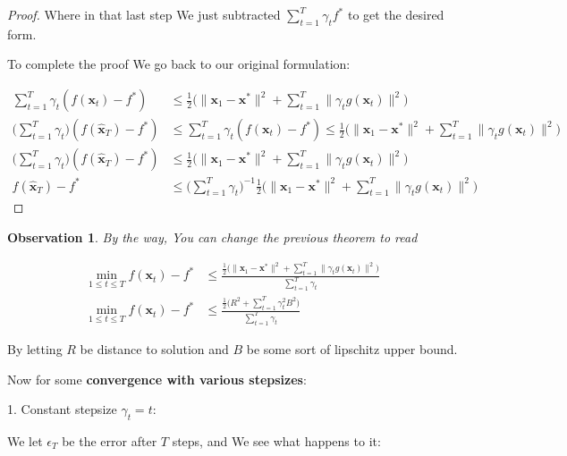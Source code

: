 \documentclass{article}
\newtheorem{observation}[theorem]{Observation}
\begin{document}
\begin{proof}
			Where in that last step We just subtracted $\sum^T_{t=1} \gamma_t f^*$ to get the desired form.
			
			To complete the proof We go back to our original formulation:
			
			\begin{align*}
				\sum^T_{t=1} \gamma_t(f(\mathbf{x}_t) - f^*)  &\le \frac{1}{2}\big( \| \mathbf{x}_1 - \mathbf{x}^* \|^2  +  \sum^T_{t=1}  \|\gamma_t g(\mathbf{x}_t) \|^2   \big)\\
				 \bigg( \sum^T_{t=1} \gamma_t\bigg) (f(\mathbf{ \hat{x}}_T) - f^*) &\le \sum^T_{t=1} \gamma_t(f(\mathbf{x}_t) - f^*)  \le \frac{1}{2}\big( \| \mathbf{x}_1 - \mathbf{x}^* \|^2  +  \sum^T_{t=1}  \|\gamma_t g(\mathbf{x}_t) \|^2   \big)\\
				  \bigg( \sum^T_{t=1} \gamma_t\bigg) (f(\mathbf{ \hat{x}}_T) - f^*) &\le \frac{1}{2}\big( \| \mathbf{x}_1 - \mathbf{x}^* \|^2  +  \sum^T_{t=1}  \|\gamma_t g(\mathbf{x}_t) \|^2   \big)\\
					 f(\mathbf{ \hat{x}}_T) - f^* &\le \bigg( \sum^T_{t=1} \gamma_t\bigg)^{-1} \frac{1}{2}\big( \| \mathbf{x}_1 - \mathbf{x}^* \|^2  +  \sum^T_{t=1}  \|\gamma_t g(\mathbf{x}_t) \|^2   \big)		  
			\end{align*}
		\end{proof}
		
		\begin{observation}
			By the way, You can change the previous theorem to read
			
			\begin{align*}
				\min_{1\le t \le T} f(\mathbf{x}_t)-f^*   &\le \frac{ \frac{1}{2}\big( \| \mathbf{x}_1 - \mathbf{x}^* \|^2  +  \sum^T_{t=1}  \|\gamma_t g(\mathbf{x}_t) \|^2   \big)}{ \sum^T_{t=1} \gamma_t}\\
				\min_{1\le t \le T} f(\mathbf{x}_t)-f^*   &\le \frac{ \frac{1}{2}\big(R^2  +  \sum^T_{t=1}  \gamma_t^2 B^2   \big)}{ \sum^T_{t=1} \gamma_t}
			\end{align*}
		\end{observation}
		
		By letting $R$ be distance to solution and $B$ be some sort of lipschitz upper bound. 
		
		Now for some \textbf{convergence with various stepsizes}:
		
		1. Constant stepsize $\gamma_t = t$:
		
		We let $\epsilon_T$ be the error after $T$ steps, and We see what happens to it:
		
\end{document}
